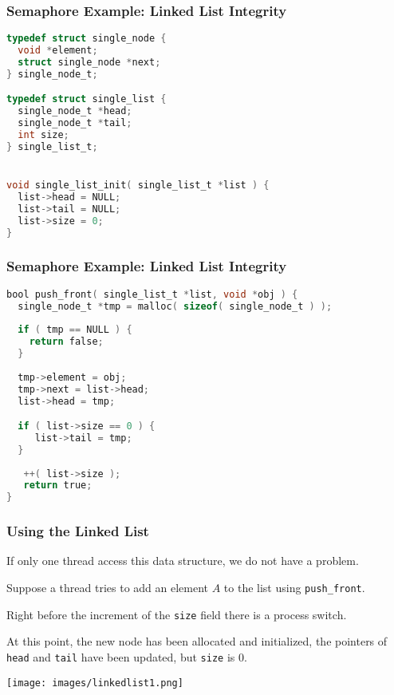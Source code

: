 \begin{frame}[fragile]
	\frametitle{Semaphore Example: Linked List Integrity}

	\begin{lstlisting}[language=C]
typedef struct single_node {
  void *element;
  struct single_node *next;
} single_node_t;

typedef struct single_list {
  single_node_t *head;
  single_node_t *tail;
  int size;
} single_list_t;


void single_list_init( single_list_t *list ) {
  list->head = NULL;
  list->tail = NULL;
  list->size = 0;
}
\end{lstlisting}
\end{frame}

\begin{frame}[fragile]
	\frametitle{Semaphore Example: Linked List Integrity}

	\begin{lstlisting}[language=C]
bool push_front( single_list_t *list, void *obj ) {
  single_node_t *tmp = malloc( sizeof( single_node_t ) );
  
  if ( tmp == NULL ) {
    return false;
  }
  
  tmp->element = obj;
  tmp->next = list->head;
  list->head = tmp;

  if ( list->size == 0 ) {
     list->tail = tmp;
  }
  
   ++( list->size );
   return true;
}

\end{lstlisting}
\end{frame}


\begin{frame}
	\frametitle{Using the Linked List}

	If only one thread access this data structure, we do not have a problem.

	Suppose a thread tries to add an element $A$ to the list using \texttt{push\_front}.

	Right before the increment of the \texttt{size} field there is a process switch.

	At this point, the new node has been allocated and initialized, the pointers of \texttt{head} and \texttt{tail} have been updated, but \texttt{size} is 0.

	\begin{center}
		\texttt{[image: images/linkedlist1.png]}
	\end{center}

\end{frame}

